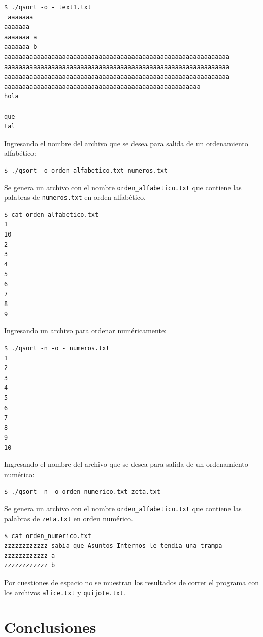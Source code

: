 \documentclass[a4paper, 12pt]{article}
\begin{document}
	\begin{verbatim}
$ ./qsort -o - text1.txt
 aaaaaaa
aaaaaaa
aaaaaaa a
aaaaaaa b
aaaaaaaaaaaaaaaaaaaaaaaaaaaaaaaaaaaaaaaaaaaaaaaaaaaaaaaaaaaaaa
aaaaaaaaaaaaaaaaaaaaaaaaaaaaaaaaaaaaaaaaaaaaaaaaaaaaaaaaaaaaaa
aaaaaaaaaaaaaaaaaaaaaaaaaaaaaaaaaaaaaaaaaaaaaaaaaaaaaaaaaaaaaa
aaaaaaaaaaaaaaaaaaaaaaaaaaaaaaaaaaaaaaaaaaaaaaaaaaaaaa
hola 

que 
tal 

	\end{verbatim}
	Ingresando el nombre del archivo que se desea para salida de un ordenamiento alfabético:
	\begin{verbatim}
$ ./qsort -o orden_alfabetico.txt numeros.txt
	\end{verbatim}
	Se genera un archivo con el nombre \texttt{orden\_alfabetico.txt} que contiene las palabras de \texttt{numeros.txt} en orden alfabético.
	\begin{verbatim}
$ cat orden_alfabetico.txt
1
10
2
3
4
5
6
7
8
9
	\end{verbatim}
Ingresando un archivo para ordenar numéricamente:
		
	\begin{verbatim}
$ ./qsort -n -o - numeros.txt
1
2
3
4
5
6
7
8
9
10
	\end{verbatim}
	Ingresando el nombre del archivo que se desea para salida de un ordenamiento numérico:
	\begin{verbatim}
$ ./qsort -n -o orden_numerico.txt zeta.txt
	\end{verbatim}
	Se genera un archivo con el nombre \texttt{orden\_alfabetico.txt} que contiene las palabras de \texttt{zeta.txt} en orden numérico.
	\begin{verbatim}
$ cat orden_numerico.txt
zzzzzzzzzzzz sabia que Asuntos Internos le tendia una trampa
zzzzzzzzzzzz a
zzzzzzzzzzzz b
	\end{verbatim}
	Por cuestiones de espacio no se muestran los resultados de correr el programa con los archivos \texttt{alice.txt} y \texttt{quijote.txt}.
	
	\section{Conclusiones}
	
\end{document}
